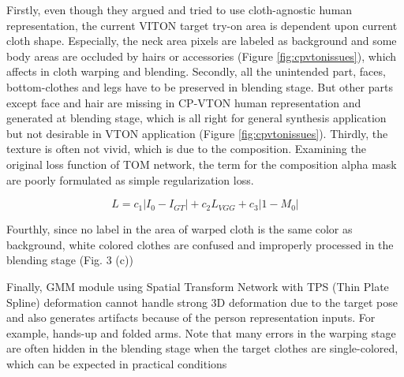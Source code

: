 Firstly, even though they argued and tried to use cloth-agnostic human representation, the current VITON target try-on area is dependent upon current cloth shape. Especially, the neck area pixels are labeled as background and some body areas are occluded by hairs or accessories (Figure \ref{fig:cpvtonissues}), which affects in cloth warping and blending. 
Secondly, all the unintended part, faces, bottom-clothes and legs have to be preserved in blending stage. But other parts except face and hair are missing in CP-VTON\cite{Wang2018TowardCI} human representation and generated at blending stage, which is all right for general synthesis application but not desirable in VTON application (Figure \ref{fig:cpvtonissues}). 
Thirdly, the texture is often not vivid, which is due to the composition. Examining the original loss function of TOM network, the term for the composition alpha mask are poorly formulated as simple regularization loss.   

\begin{equation}
L = c_1 | I_0-I_{GT} |+  c_2 L_{VGG}+c_3 |1-M_0 |        
\end{equation} 

Fourthly, since no label in the area of warped cloth is the same color as background, white colored clothes are confused and improperly processed in the blending stage (Fig. 3 (c))


Finally, GMM module using Spatial Transform Network\cite{JaderbergSZK15} with TPS (Thin Plate Spline)\cite{Bookstein1989PrincipalWT} deformation cannot handle strong 3D deformation due to the target pose and also generates artifacts because of the person representation inputs. For example, hands-up and folded arms.  Note that many errors in the warping stage are often hidden in the blending stage when the target clothes are single-colored, which can be expected in practical conditions 



